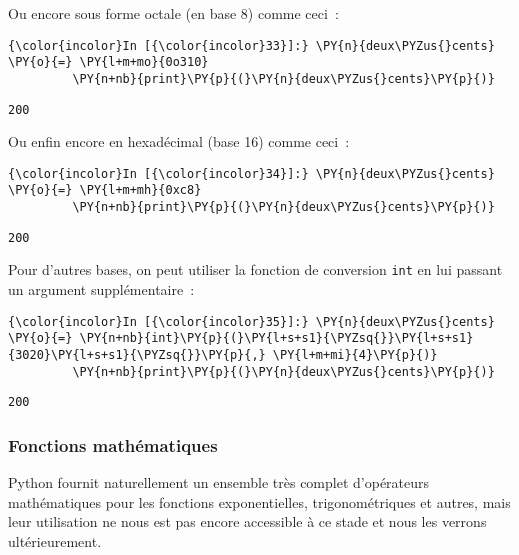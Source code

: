     Ou encore sous forme octale (en base 8) comme ceci~:

    \begin{Verbatim}[commandchars=\\\{\}]
{\color{incolor}In [{\color{incolor}33}]:} \PY{n}{deux\PYZus{}cents} \PY{o}{=} \PY{l+m+mo}{0o310}
         \PY{n+nb}{print}\PY{p}{(}\PY{n}{deux\PYZus{}cents}\PY{p}{)}
\end{Verbatim}


    \begin{Verbatim}[commandchars=\\\{\}]
200

    \end{Verbatim}

    Ou enfin encore en hexadécimal (base 16) comme ceci~:

    \begin{Verbatim}[commandchars=\\\{\}]
{\color{incolor}In [{\color{incolor}34}]:} \PY{n}{deux\PYZus{}cents} \PY{o}{=} \PY{l+m+mh}{0xc8}
         \PY{n+nb}{print}\PY{p}{(}\PY{n}{deux\PYZus{}cents}\PY{p}{)}
\end{Verbatim}


    \begin{Verbatim}[commandchars=\\\{\}]
200

    \end{Verbatim}

    Pour d'autres bases, on peut utiliser la fonction de conversion
\texttt{int} en lui passant un argument supplémentaire~:

    \begin{Verbatim}[commandchars=\\\{\}]
{\color{incolor}In [{\color{incolor}35}]:} \PY{n}{deux\PYZus{}cents} \PY{o}{=} \PY{n+nb}{int}\PY{p}{(}\PY{l+s+s1}{\PYZsq{}}\PY{l+s+s1}{3020}\PY{l+s+s1}{\PYZsq{}}\PY{p}{,} \PY{l+m+mi}{4}\PY{p}{)}
         \PY{n+nb}{print}\PY{p}{(}\PY{n}{deux\PYZus{}cents}\PY{p}{)}
\end{Verbatim}


    \begin{Verbatim}[commandchars=\\\{\}]
200

    \end{Verbatim}

    \hypertarget{fonctions-mathuxe9matiques}{%
\subsubsection{Fonctions
mathématiques}\label{fonctions-mathuxe9matiques}}

    Python fournit naturellement un ensemble très complet d'opérateurs
mathématiques pour les fonctions exponentielles, trigonométriques et
autres, mais leur utilisation ne nous est pas encore accessible à ce
stade et nous les verrons ultérieurement.


    
    
    
